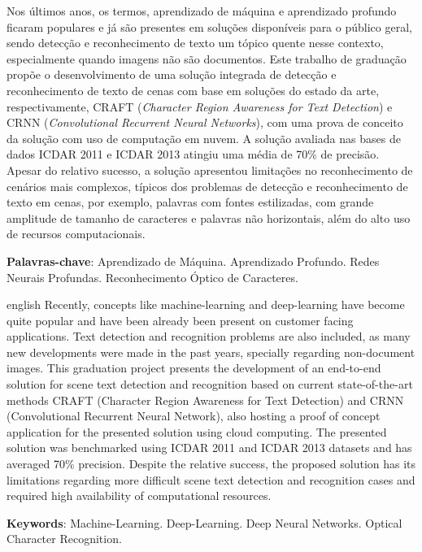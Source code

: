 
\setlength{\absparsep}{18pt} %
\begin{resumo}
Nos últimos anos, os termos, aprendizado de máquina e aprendizado profundo ficaram populares e já são 
presentes em soluções disponíveis para o público geral, sendo detecção e reconhecimento de texto um tópico 
quente nesse contexto, especialmente quando imagens não são documentos.
Este trabalho de graduação propõe o desenvolvimento de uma solução integrada de detecção e reconhecimento 
de texto de cenas com base em soluções do estado da arte, respectivamente, CRAFT (\textit{Character Region Awareness for Text Detection}) 
e CRNN (\textit{Convolutional Recurrent Neural Networks}), com uma prova de conceito da solução com uso de computação em nuvem.
A solução avaliada nas bases de dados ICDAR 2011 e ICDAR 2013 atingiu uma média de 70\% de precisão. 
Apesar do relativo sucesso, a solução apresentou limitações no reconhecimento de cenários mais complexos, típicos 
dos problemas de detecção e reconhecimento de texto em cenas, por exemplo, palavras com fontes estilizadas, 
com grande amplitude de tamanho de caracteres e palavras não horizontais, além do alto uso de recursos computacionais.

 \textbf{Palavras-chave}: Aprendizado de Máquina. Aprendizado Profundo. Redes Neurais Profundas. Reconhecimento Óptico de Caracteres.
\end{resumo}

\begin{resumo}[Abstract]
 \begin{otherlanguage*}{english}
   Recently, concepts like machine-learning and deep-learning have become quite popular and have been already been 
   present on customer facing applications. Text detection and recognition problems are also included, as many new 
   developments were made in the past years, specially regarding non-document images.
   This graduation project presents the development of an end-to-end solution for scene text detection and recognition 
   based on current state-of-the-art methods CRAFT (Character Region Awareness for Text Detection) and CRNN 
   (Convolutional Recurrent Neural Network), also hosting a proof of concept application for the presented solution using cloud computing. 
   The presented solution was benchmarked using ICDAR 2011 and ICDAR 2013 datasets and has averaged 70\% precision. Despite the 
   relative success, the proposed solution has its limitations regarding more difficult scene text detection and recognition 
   cases and required high availability of computational resources.

   \vspace{\onelineskip}
 
   \noindent 
   \textbf{Keywords}: Machine-Learning. Deep-Learning. Deep Neural Networks. Optical Character Recognition.
 \end{otherlanguage*}
\end{resumo}